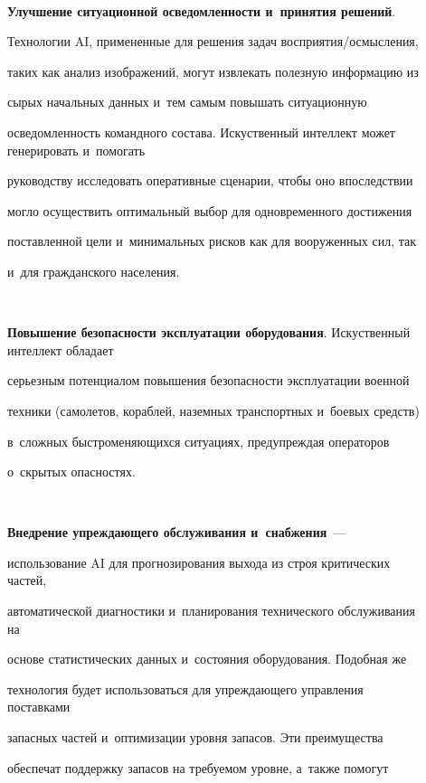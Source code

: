 \begin{description}


\item[\,]


  \textbf{Улучшение ситуационной осведомленности и~принятия решений}.


Технологии AI, примененные для решения задач вос\-при\-я\-тия\!/\!осмыс\-ле\-ния,


таких как анализ изображений, могут извлекать полезную информацию из


сырых начальных данных и~тем самым повышать ситуационную


осведомленность командного состава. Искуственный интеллект может генерировать и~помогать


руководству исследовать оперативные сценарии, чтобы оно впоследствии


могло осуществить оптимальный выбор для одновременного достижения


по\-став\-лен\-ной цели и~минимальных рисков как для вооруженных сил, так


и~для гражданского населения.


\item[\,]


  \textbf{Повышение безопасности эксплуатации оборудования}. Искуственный интеллект обладает


серьезным потенциалом повышения безопас\-ности эксплуатации военной


техники (самолетов, кораблей, наземных транспортных и~боевых средств)


в~слож\-ных быст\-ро\-ме\-ня\-ющих\-ся ситуациях, предуп\-реж\-дая операторов


о~скрытых опасностях.


\item[\,]


  \textbf{Внедрение упреждающего обслуживания и~снабжения}~---


использование AI для прогнозирования выхода из строя критических частей,


автоматической диагностики и~планирования технического обслуживания на


основе статистических данных и~со\-сто\-яния оборудования. Подобная же


технология будет использоваться для упреж\-да\-юще\-го управ\-ле\-ния поставками


запасных частей и~оптимизации уровня запасов. Эти преимущества


обеспечат поддержку запасов на тре\-бу\-емом уровне, а~так\-же помогут



\end{description}

